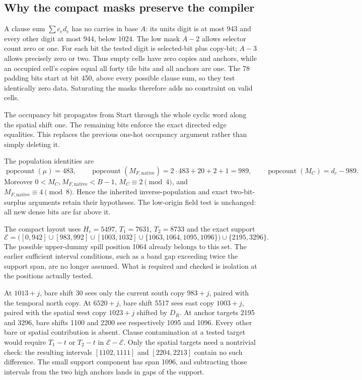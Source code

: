 \documentclass[11pt]{article}
\newcommand{\pc}{\operatorname{popcount}}
\begin{document}
\subsection{Why the compact masks preserve the compiler}
A clause sum $\sum c_ed_e$ has no carries in base $A$: its units digit is at most 943 and every other digit at most 944, below 1024. The low mask $A-2$ allows selector count zero or one. For each bit the tested digit is selected-bit plus copy-bit; $A-3$ allows precisely zero or two. Thus empty cells have zero copies and anchors, while an occupied cell's copies equal all forty tile bits and all anchors are one. The 78 padding bits start at bit 450, above every possible clause sum, so they test identically zero data. Saturating the masks therefore adds no constraint on valid cells.

The occupancy bit propagates from Start through the whole cyclic word along the spatial shift one. The remaining bits enforce the exact directed edge equalities. This replaces the previous one-hot occupancy argument rather than simply deleting it.

The population identities are
\[
 \pc(\mu)=483,\qquad \pc(M_{F,\mathrm{native}})=2\cdot483+20+2+1=989,
 \qquad\pc(M_C)=d_c-989.
\]
Moreover $0<M_C,M_{F,\mathrm{native}}<B-1$, $M_C\equiv2\pmod4$, and $M_{F,\mathrm{native}}\equiv4\pmod8$. Hence the inherited inverse-population and exact two-bit-surplus arguments retain their hypotheses. The low-origin field test is unchanged: all new dense bits are far above it.

The compact layout uses $H_c=5497$, $T_1=7631$, $T_2=8733$ and the exact support
\[
 \mathcal E=\bigl([0,942]\cup[983,992]\cup[1003,1032]
 \cup\{1063,1064,1095,1096\}\bigr)\cup\{2195,3296\}.
\]
The possible upper-dummy spill position 1064 already belongs to this set. The earlier sufficient interval conditions, such as a band gap exceeding twice the support span, are no longer assumed. What is required and checked is isolation at the positions actually tested.

At $1013+j$, bare shift 30 sees only the current south copy $983+j$, paired with the temporal north copy. At $6520+j$, bare shift 5517 sees east copy $1003+j$, paired with the spatial west copy $1023+j$ shifted by $D_R$. At anchor targets 2195 and 3296, bare shifts 1100 and 2200 see respectively 1095 and 1096. Every other bare or spatial contribution is absent. Clause contamination at a tested target would require $T_1-t$ or $T_2-t$ in $\mathcal E-\mathcal E$. Only the spatial targets need a nontrivial check: the resulting intervals $[1102,1111]$ and $[2204,2213]$ contain no such difference. The small support component has span 1096, and subtracting those intervals from the two high anchors lands in gaps of the support.
\end{document}
